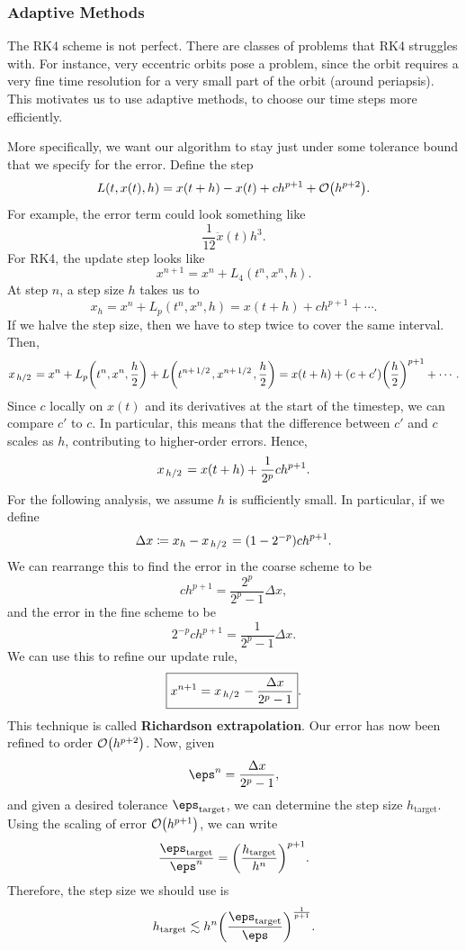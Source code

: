 \documentclass[12pt,letterpaper]{article}
\begin{document}
\subsubsection{Adaptive Methods}
The RK4 scheme is not perfect. There are classes of problems that RK4 struggles with. For instance, very eccentric orbits pose a problem, since the orbit requires a very fine time resolution for a very small part of the orbit (around periapsis). This motivates us to use adaptive methods, to choose our time steps more efficiently.

More specifically, we want our algorithm to stay just under some tolerance bound that we specify for the error. Define the step
\[L(t,x(t),h)=x(t+h)-x(t)+ch^{p+1}+\order{h^{p+2}}.\]
For example, the error term could look something like
\[\frac1{12}\ddot x(t)h^3.\]
For RK4, the update step looks like
\[x^{n+1}=x^n+L_4(t^n,x^n,h).\]
At step $n$, a step size $h$ takes us to
\[x_h=x^n+L_p(t^n,x^n,h)=x(t+h)+ch^{p+1}+\dotsb.\]
If we halve the step size, then we have to step twice to cover the same interval. Then,
\[x_{\flatfrac h2}=x^n+L_p\qty(t^n,x^n,\frac h2)+L\qty(t^{n+\flatfrac12},x^{n+\flatfrac12},\frac h2)=x(t+h)+(c+c')\qty(\frac h2)^{p+1}+\dotsb.\]
Since $c$ locally on $x(t)$ and its derivatives at the start of the timestep, we can compare $c'$ to $c$. In particular, this means that the difference between $c'$ and $c$ scales as $h$, contributing to higher-order errors. Hence,
\[x_{\flatfrac h2}=x(t+h)+\frac1{2^p}ch^{p+1}.\]
For the following analysis, we assume $h$ is sufficiently small. In particular, if we define
\[\Delta x\coloneq x_h-x_{\flatfrac h2}=(1-2^{-p})ch^{p+1}.\]
We can rearrange this to find the error in the coarse scheme to be
\[ch^{p+1}=\frac{2^p}{2^p-1}\Delta x,\]
and the error in the fine scheme to be
\[2^{-p}ch^{p+1}=\frac1{2^p-1}\Delta x.\]
We can use this to refine our update rule,
\[\boxed{x^{n+1}=x_{\flatfrac h2}-\frac{\Delta x}{2^p-1}}.\]
This technique is called \textbf{Richardson extrapolation}. Our error has now been refined to order $\order{h^{p+2}}$. Now, given
\[\eps^n=\frac{\Delta x}{2^p-1},\]
and given a desired tolerance $\eps_{\text{target}}$, we can determine the step size $h_{\text{target}}$. Using the scaling of error $\order{h^{p+1}}$, we can write
\[\frac{\eps_{\text{target}}}{\eps^n}=\qty(\frac{h_{\text{target}}}{h^n})^{p+1}.\]
Therefore, the step size we should use is
\[h_{\text{target}}\lesssim h^n\qty(\frac{\eps_{\text{target}}}{\eps})^{\frac1{p+1}}.\]
\end{document}
